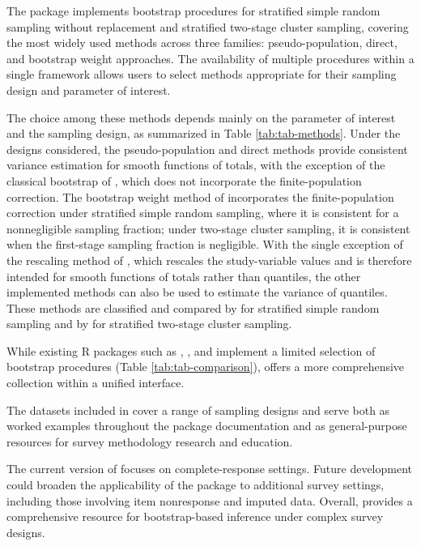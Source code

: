 The package implements bootstrap procedures for stratified simple random sampling without replacement and stratified two-stage cluster sampling, covering the most widely used methods across three families: pseudo-population, direct, and bootstrap weight approaches. The availability of multiple procedures within a single framework allows users to select methods appropriate for their sampling design and parameter of interest.

The choice among these methods depends mainly on the parameter of interest and the sampling design, as summarized in Table \ref{tab:tab-methods}. Under the designs considered, the pseudo-population and direct methods provide consistent variance estimation for smooth functions of totals, with the exception of the classical bootstrap of \citet{Efron:1979}, which does not incorporate the finite-population correction. The bootstrap weight method of \citet{Rao:Wu:Yue:1992} incorporates the finite-population correction under stratified simple random sampling, where it is consistent for a nonnegligible sampling fraction; under two-stage cluster sampling, it is consistent when the first-stage sampling fraction is negligible. With the single exception of the rescaling method of \citet{Rao:Wu:1988}, which rescales the study-variable values and is therefore intended for smooth functions of totals rather than quantiles, the other implemented methods can also be used to estimate the variance of quantiles. These methods are classified and compared by \citet{Mashreghi:Haziza:Leger:2016} for stratified simple random sampling and by \citet{Chen:Haziza:Mashreghi:2022} for stratified two-stage cluster sampling.

While existing R packages such as  \citep{Lumley:2004},  \citep{Schneider:2025}, and  \citep{Feehan:2023} implement a limited selection of bootstrap procedures (Table \ref{tab:tab-comparison}),  offers a more comprehensive collection within a unified interface.

The datasets included in  cover a range of sampling designs and serve both as worked examples throughout the package documentation and as general-purpose resources for survey methodology research and education.

The current version of  focuses on complete-response settings. Future development could broaden the applicability of the package to additional survey settings, including those involving item nonresponse and imputed data. Overall,  provides a comprehensive resource for bootstrap-based inference under complex survey designs.

